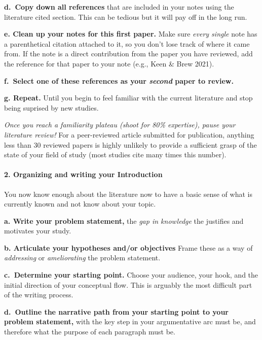 \documentclass[
]{book}
\begin{document}
\textbf{d.~Copy down all references} that are included in your notes using the literature cited section. This can be tedious but it will pay off in the long run.

\textbf{e. Clean up your notes for this first paper.} Make sure \emph{every single} note has a parenthetical citation attached to it, so you don't lose track of where it came from. If the note is a direct contribution from the paper you have reviewed, add the reference for that paper to your note (e.g., Keen \& Brew 2021).

\textbf{f.~Select one of these references as your \emph{second} paper to review.}

\textbf{g. Repeat.} Until you begin to feel familiar with the current literature and stop being suprised by new studies.

\emph{Once you reach a familiarity plateau (shoot for 80\% expertise), pause your literature review!} For a peer-reviewed article submitted for publication, anything less than 30 reviewed papers is highly unlikely to provide a sufficient grasp of the state of your field of study (most studies cite many times this number).

\hypertarget{organizing-and-writing-your-introduction}{%
\paragraph{2. Organizing and writing your Introduction}\label{organizing-and-writing-your-introduction}}

You now know enough about the literature now to have a basic sense of what is currently known and not know about your topic.

\textbf{a. Write your problem statement,} the \emph{gap in knowledge} the justifies and motivates your study.

\textbf{b. Articulate your hypotheses and/or objectives} Frame these as a way of \emph{addressing} or \emph{ameliorating} the problem statement.

\textbf{c.~Determine your starting point.} Choose your audience, your hook, and the initial direction of your conceptual flow. This is arguably the most difficult part of the writing process.

\textbf{d.~Outline the narrative path from your starting point to your problem statement,} with the key step in your argumentative arc must be, and therefore what the purpose of each paragraph must be.
\end{document}
